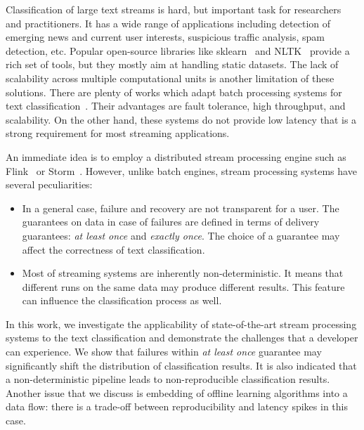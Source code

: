 \label {fs-short-intro}

Classification of large text streams is hard, but important task for researchers and practitioners. It has a wide range of applications including detection of emerging news and current user interests, suspicious traffic analysis, spam detection, etc. Popular open-source libraries like sklearn~\cite{sklearn_api} and NLTK~\cite{bird2009natural} provide a rich set of tools, but they mostly aim at handling static datasets. The lack of scalability across multiple computational units is another limitation of these solutions. There are plenty of works which adapt batch processing systems for text classification~\cite{semberecki2016distributed, svyatkovskiy2016large, baltas2016apache}. Their advantages are fault tolerance, high throughput, and scalability. On the other hand, these systems do not provide low latency that is a strong requirement for most streaming applications.

An immediate idea is to employ a distributed stream processing engine such as Flink~\cite{Carbone:2017:SMA:3137765.3137777} or Storm~\cite{apache:storm}. However, unlike batch engines, stream processing systems have several peculiarities: 

\begin{itemize}
    \item In a general case, failure and recovery are not transparent for a user. The guarantees on data in case of failures are defined in terms of delivery guarantees: {\em at least once} and {\em exactly once}. The choice of a guarantee may affect the correctness of text classification.
    \item Most of streaming systems are inherently non-deterministic. It means that different runs on the same data may produce different results. This feature can influence the classification process as well.
\end{itemize}

In this work, we investigate the applicability of state-of-the-art stream processing systems to the text classification and demonstrate the challenges that a developer can experience. We show that failures within {\em at least once} guarantee may significantly shift the distribution of classification results. It is also indicated that a non-deterministic pipeline leads to non-reproducible classification results. Another issue that we discuss is embedding of offline learning algorithms into a data flow: there is a trade-off between reproducibility and latency spikes in this case.  

